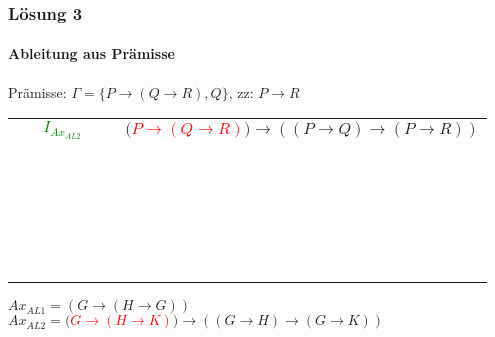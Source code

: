 \begin{frame}
	\frametitle{Lösung 3}
	\framesubtitle{Ableitung aus Prämisse}
	Prämisse: $\Gamma =\{P\rightarrow(Q\rightarrow R), Q\}$, zz: $P\rightarrow R$\\
	\begin{tabular}{cl}
		\textcolor{green}{$I_{Ax_{AL2}}$}         & $($\textcolor{red}{$P\rightarrow(Q\rightarrow R)$}$)\rightarrow((P\rightarrow Q)\rightarrow(P\rightarrow R))$ \\
		\textcolor{white}{$II_{\text{Prämisse}}$} & \textcolor{white}{$P\rightarrow(Q\rightarrow R)$}                                                             \\
		\textcolor{white}{$III_{MP(I, II)}$}      & \textcolor{white}{$(P\rightarrow Q)\rightarrow(P\rightarrow R)$}                                              \\
		\textcolor{white}{$IV_{\text{Prämisse}}$} & \textcolor{white}{$Q$}                                                                                        \\
		\textcolor{white}{$V_{IV, Ax_{AL1}}$}     & \textcolor{white}{$Q\rightarrow(P\rightarrow Q)$}                                                             \\
		\textcolor{white}{$VI_{MP(IV, V)}$}       & \textcolor{white}{$P\rightarrow Q$}                                                                           \\
		\textcolor{white}{$VII_{MP(III, VI)}$}    & \textcolor{white}{$P\rightarrow R$}                                                                           \\
	\end{tabular}
	$Ax_{AL1} = (G\rightarrow(H\rightarrow G))$\\
	$Ax_{AL2} = ($\textcolor{red}{$G\rightarrow(H\rightarrow K)$}$)\rightarrow((G\rightarrow H)\rightarrow(G\rightarrow K))$\\
\end{frame}
